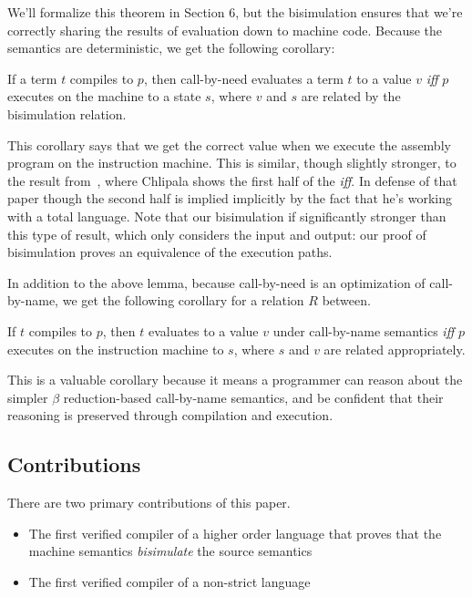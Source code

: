 We'll formalize this theorem in Section 6, but the bisimulation ensures that
we're correctly sharing the results of evaluation down to machine code. Because
the semantics are deterministic, we get the following corollary:   

\begin{corollary}
If a term $t$ compiles to $p$, then call-by-need evaluates a term $t$ to a value
$v$ \emph{iff} $p$ executes on the machine to a state $s$, where $v$ and $s$ are
related by the bisimulation relation.
\end{corollary}

This corollary says that we get the correct value when we execute the assembly
program on the instruction machine. This is similar, though slightly stronger,
to the result from~\cite{chlipala2007certified}, where Chlipala shows the first
half of the \emph{iff}. In defense of that paper though the second half is
implied implicitly by the fact that he's working with a total language. Note
that our bisimulation if significantly stronger than this type of result, which
only considers the input and output: our proof of bisimulation proves an
equivalence of the execution paths.

In addition to the above lemma, because call-by-need is an optimization of
call-by-name, we get the following corollary for a relation $R$ between.

\begin{corollary}
If $t$ compiles to $p$, then $t$ evaluates to a value $v$ under call-by-name
semantics \emph{iff} $p$ executes on the instruction machine to $s$, where $s$
and $v$ are related appropriately.
\end{corollary}

This is a valuable corollary because it means a programmer can reason about the
simpler $\beta$ reduction-based call-by-name semantics, and be confident that
their reasoning is preserved through compilation and execution.

\subsection{Contributions}
There are two primary contributions of this paper. 
\begin{itemize}
\item The first verified compiler of a higher order language that proves that
the machine semantics \emph{bisimulate} the source semantics
\item The first verified compiler of a non-strict language
\end{itemize}

